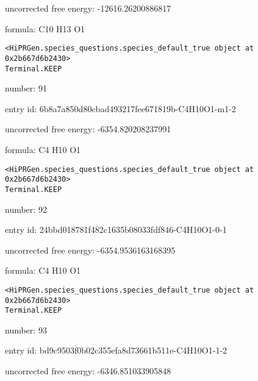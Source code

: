 \documentclass{article}
\begin{document}
uncorrected free energy: -12616.26200886817



formula: C10 H13 O1


\vspace{1cm}
\begin{verbatim}
<HiPRGen.species_questions.species_default_true object at 0x2b667d6b2430>
Terminal.KEEP
\end{verbatim}


number: 91



entry id: 6b8a7a850d80cbad493217fee671819b-C4H10O1-m1-2



uncorrected free energy: -6354.820208237991



formula: C4 H10 O1


\vspace{1cm}
\begin{verbatim}
<HiPRGen.species_questions.species_default_true object at 0x2b667d6b2430>
Terminal.KEEP
\end{verbatim}


number: 92



entry id: 24bbd018781f482c1635b08033fdf846-C4H10O1-0-1



uncorrected free energy: -6354.9536163168395



formula: C4 H10 O1


\vspace{1cm}
\begin{verbatim}
<HiPRGen.species_questions.species_default_true object at 0x2b667d6b2430>
Terminal.KEEP
\end{verbatim}


number: 93



entry id: bd9c9503f0b02c355efa8d73661b511e-C4H10O1-1-2



uncorrected free energy: -6346.851033905848
\end{document}
